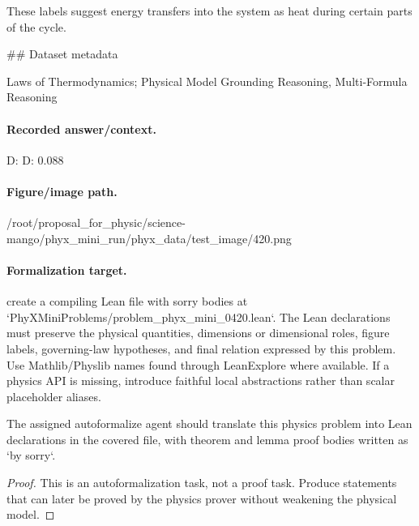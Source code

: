 These labels suggest energy transfers into the system as heat during certain parts of the cycle.

\#\# Dataset metadata

Laws of Thermodynamics; Physical Model Grounding Reasoning, Multi-Formula Reasoning

\paragraph{Recorded answer/context.}
D: D: 0.088

\paragraph{Figure/image path.}
/root/proposal\_for\_physic/science-mango/phyx\_mini\_run/phyx\_data/test\_image/420.png

\paragraph{Formalization target.}
create a compiling Lean file with sorry bodies at `PhyXMiniProblems/problem\_phyx\_mini\_0420.lean`. The Lean declarations must preserve the physical quantities, dimensions or dimensional roles, figure labels, governing-law hypotheses, and final relation expressed by this problem.
Use Mathlib/Physlib names found through LeanExplore where available. If a physics API is missing, introduce faithful local abstractions rather than scalar placeholder aliases.

\begin{theorem}
\label{thm:physics:phyx_mini_0420:target}
The assigned autoformalize agent should translate this physics problem into Lean declarations in the covered file, with theorem and lemma proof bodies written as `by sorry`.
\end{theorem}
\begin{proof}
This is an autoformalization task, not a proof task. Produce statements that can later be proved by the physics prover without weakening the physical model.
\end{proof}

